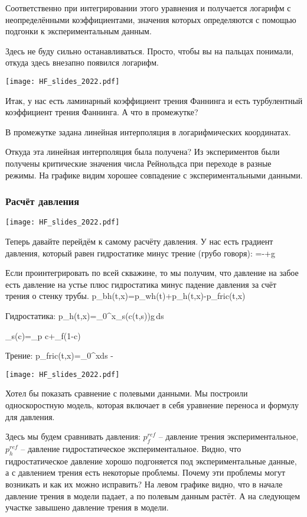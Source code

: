 \documentclass[main.tex]{subfiles}
\begin{document}
Соответственно при интегрировании этого уравнения и получается логарифм с неопределёнными коэффициентами, значения которых определяются с помощью подгонки к экспериментальным данным.

Здесь не буду сильно останавливаться.
Просто, чтобы вы на пальцах понимали, откуда здесь внезапно появился логарифм.

\texttt{[image: HF\_slides\_2022.pdf]}

Итак, у нас есть ламинарный коэффициент трения Фаннинга и есть турбулентный коэффициент трения Фаннинга.
А что в промежутке?

В промежутке задана линейная интерполяция в логарифмических координатах.

Откуда эта линейная интерполяция была получена?
Из экспериментов были получены критические значения числа Рейнольдса при переходе в разные режимы.
На графике видим хорошее совпадение с экспериментальными данными.

\subsubsection{Расчёт давления}

\texttt{[image: HF\_slides\_2022.pdf]}

Теперь давайте перейдём к самому расчёту давления.
У нас есть градиент давления, который равен гидростатике минус трение (грубо говоря):
\beq
{}=-+\overline{\rho}g\sin{\theta}
\eeq

Если проинтегрировать по всей скважине, то мы получим, что давление на забое есть давление на устье плюс гидростатика  минус падение давления за счёт трения о стенку трубы.
\beq
p_{bh}(t,x)=p_{wh}(t)+\Delta p_h(t,x)-\Delta p_{fric}(t,x)
\eeq

Гидростатика:
\beq
\Delta p_h(t,x)=\int\limits_{0}^{x}\rho_s(c(t,s))g\,ds
\eeq

\beq
\rho_s(c)=\rho_p c+\rho_f\left(1-c\right)
\eeq

Трение:
\beq
\Delta p_{fric}(t,x)=\int\limits_0^xds - 
\eeq

\texttt{[image: HF\_slides\_2022.pdf]}

Хотел бы показать сравнение с полевыми данными.
Мы построили односкоростную модель, которая включает в себя уравнение переноса и формулу для давления.

Здесь мы будем сравнивать давления: $p_f^{ref}$ -- давление трения экспериментальное, $p_h^{ref}$ -- давление гидростатическое экспериментальное.
Видно, что гидростатическое давление хорошо подгоняется под экспериментальные данные, а с давлением трения есть некоторые проблемы.
Почему эти проблемы могут возникать и как их можно исправить?
На левом графике видно, что в начале давление трения  в модели падает, а по полевым данным растёт.
А на следующем участке завышено давление трения в модели.
\end{document}
